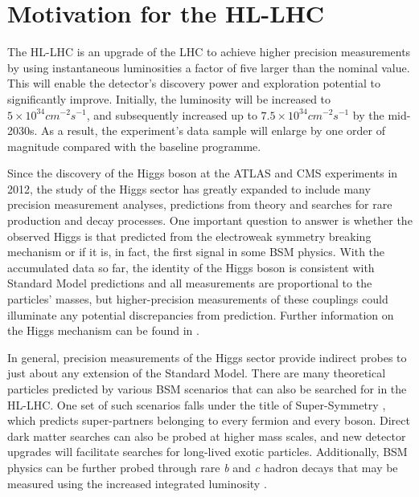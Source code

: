 \section{Motivation for the HL-LHC}
\label{hi-lumi}


The HL-LHC is an upgrade of the \ac{LHC} to achieve higher precision measurements by using instantaneous luminosities a factor of five larger than the nominal value. This will enable the detector's discovery power and exploration potential to significantly improve. Initially, the luminosity will be increased to $5 \times 10^{34} cm^{−2}s^{−1}$, and subsequently increased up to $7.5 \times 10^{34} cm^{−2}s^{−1}$ by the mid-2030s. As a result, the experiment's data sample will enlarge by one order of magnitude compared with the baseline programme.

Since the discovery of the Higgs boson at the ATLAS and CMS experiments \cite{ATLAS-HIGGS, CMS-HIGGS} in 2012, the study of the Higgs sector has greatly expanded to include many precision measurement analyses, predictions from theory and searches for rare production and decay processes. One important question to answer is whether the observed Higgs is that predicted from the electroweak symmetry breaking mechanism \cite{ewsb} or if it is, in fact, the first signal in some BSM physics. With the accumulated data so far, the identity of the Higgs boson is consistent with Standard Model predictions and all measurements are proportional to the particles’ masses, but higher-precision measurements of these couplings could illuminate any potential discrepancies from prediction. Further information on the Higgs mechanism can be found in \cite{Bednyakov_2008}.


In general, precision measurements of the Higgs sector provide indirect probes to just about any extension of the Standard Model. There are many theoretical particles predicted by various BSM scenarios that can also be searched for in the HL-LHC. One set of such scenarios falls under the title of Super-Symmetry \cite{supersym}, which predicts super-partners belonging to every fermion and every boson. Direct dark matter searches can also be probed at higher mass scales, and new detector upgrades will facilitate searches for long-lived exotic particles. Additionally, BSM physics can be further probed through rare \textit{b} and \textit{c} hadron decays that may be measured using the increased integrated luminosity \cite{wg-bsm}.

